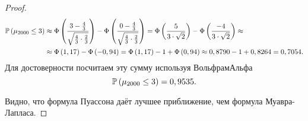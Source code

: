 \begin{proof}
	\[
		\begin{aligned}
			\mathbb P\left(\mu_{2000} \leq  3\right) &
			\approx \Phi\left(\frac{3-\frac{4}{3}}{\sqrt{\frac{4}{3} \cdot \frac{2}{3}}}\right) - \Phi\left(\frac{0-\frac{4}{3}}{\sqrt{\frac{4}{3} \cdot \frac{2}{3}}}\right)
			= \Phi\left(\frac{5}{3 \cdot \sqrt{2}}\right) - \Phi\left(\frac{-4}{3 \cdot \sqrt{2}}\right) \approx
			\\ &
			\approx \Phi\left(1,17\right) - \Phi\left(-0,94\right)
			= \Phi\left(1,17\right) - 1 + \Phi\left(0,94\right)
			\approx 0,8790 - 1 + 0,8264 = 0,7054.
		\end{aligned}
	\]
	Для достоверности посчитаем эту сумму используя ВольфрамАльфа
	\[
		\mathbb P\left(\mu_{2000} \leq  3\right) = 0,9535.
	\]

	Видно, что формула Пуассона даёт лучшее приближение, чем формула Муавра-Лапласа.
\end{proof}